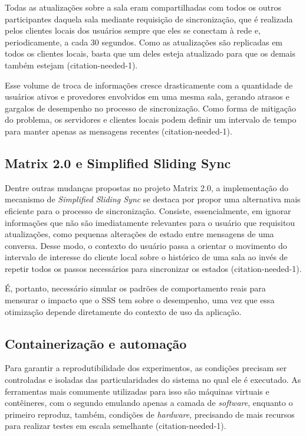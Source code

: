     Todas as atualizações sobre a sala eram compartilhadas com todos os outros participantes daquela sala mediante requisição de sincronização, que é realizada pelos clientes locais dos usuários sempre que eles se conectam à rede e, periodicamente, a cada 30 segundos. Como as atualizações são replicadas em todos os clientes locais, basta que um deles esteja atualizado para que os demais também estejam (citation-needed-1).

    Esse volume de troca de informações cresce drasticamente com a quantidade de usuários ativos e provedores envolvidos em uma mesma sala, gerando atrasos e gargalos de desempenho no processo de sincronização. Como forma de mitigação do problema, os servidores e clientes locais podem definir um intervalo de tempo para manter apenas as mensagens recentes (citation-needed-1).

\subsection{Matrix 2.0 e Simplified Sliding Sync}

    Dentre outras mudanças propostas no projeto Matrix 2.0, a implementação do mecanismo de \textit{Simplified Sliding Sync} se destaca por propor uma alternativa mais eficiente para o processo de sincronização. Consiste, essencialmente, em ignorar informações que não são imediatamente relevantes para o usuário que requisitou atualizações, como pequenas alterações de estado entre mensagens de uma conversa. Desse modo, o contexto do usuário passa a orientar o movimento do intervalo de interesse do cliente local sobre o histórico de uma sala ao invés de repetir todos os passos necessários para sincronizar os estados (citation-needed-1).

	É, portanto, necessário simular os padrões de comportamento reais para mensurar o impacto que o SSS tem sobre o desempenho, uma vez que essa otimização depende diretamente do contexto de uso da aplicação. 

	
\subsection{Containerização e automação}

    Para garantir a reprodutibilidade dos experimentos, as condições precisam ser controladas e isoladas das particularidades do sistema no qual ele é executado. As ferramentas mais comumente utilizadas para isso são máquinas virtuais e contêineres, com o segundo emulando apenas a camada de \textit{software}, enquanto o primeiro reproduz, também, condições de \textit{hardware}, precisando de mais recursos para realizar testes em escala semelhante (citation-needed-1).

